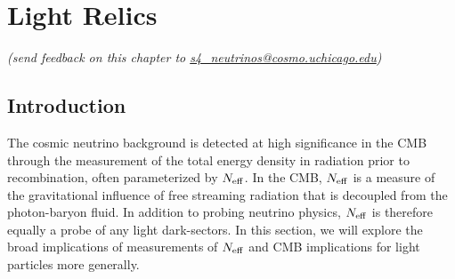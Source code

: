  
\chapter{Light Relics}


\def\beq{\begin{equation}}
\def\eeq{\end{equation}}

\def\bea{\begin{eqnarray}}
\def\eea{\end{eqnarray}}

\def\Neff{N_{\rm eff}}
\def\Nf{N_{\rm eff}}
\def\gs{g_{\star}}
\def\Mpl{M_{\rm P}}


\def\lsim{\raise-.75ex\hbox{$\buildrel<\over\sim$}}

\begin{center}
{\small \it (send feedback on this chapter to \href{mailto:s4_neutrinos@cosmo.uchicago.edu}{s4\_neutrinos@cosmo.uchicago.edu})}
\end{center}

\begin{quotation}


  
\end{quotation}
    
\section{Introduction}



The cosmic neutrino background is detected at high significance in the CMB through the measurement of the total energy density in radiation prior to recombination, often parameterized by $\Neff$.  In the CMB, $\Neff$ is a measure of the gravitational influence of free streaming radiation that is decoupled from the photon-baryon fluid.  In addition to probing neutrino physics, $\Neff$ is therefore equally a probe of any light dark-sectors.  In this section, we will explore the broad implications of measurements of $\Neff$ and CMB implications for light particles more generally.

